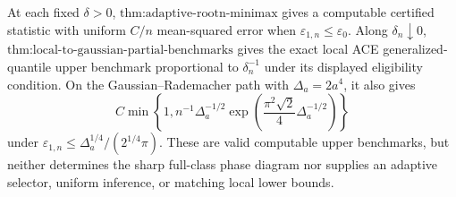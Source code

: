 At each fixed \(\delta>0\), \(\text{thm:adaptive-rootn-minimax}\) gives a computable certified statistic with uniform \(C/n\) mean-squared error when \(\varepsilon_{1,n}\le\varepsilon_0\). Along \(\delta_n\downarrow0\), \(\text{thm:local-to-gaussian-partial-benchmarks}\) gives the exact local ACE generalized-quantile upper benchmark proportional to \(\delta_n^{-1}\) under its displayed eligibility condition. On the Gaussian--Rademacher path with \(\Delta_a=2a^4\), it also gives
\[
 C\min\!\left\{1,n^{-1}\Delta_a^{-1/2}
 \exp\!\left(\frac{\pi^2\sqrt2}{4}\Delta_a^{-1/2}\right)\right\}
\]
under \(\varepsilon_{1,n}\le\Delta_a^{1/4}/(2^{1/4}\pi)\). These are valid computable upper benchmarks, but neither determines the sharp full-class phase diagram nor supplies an adaptive selector, uniform inference, or matching local lower bounds.
